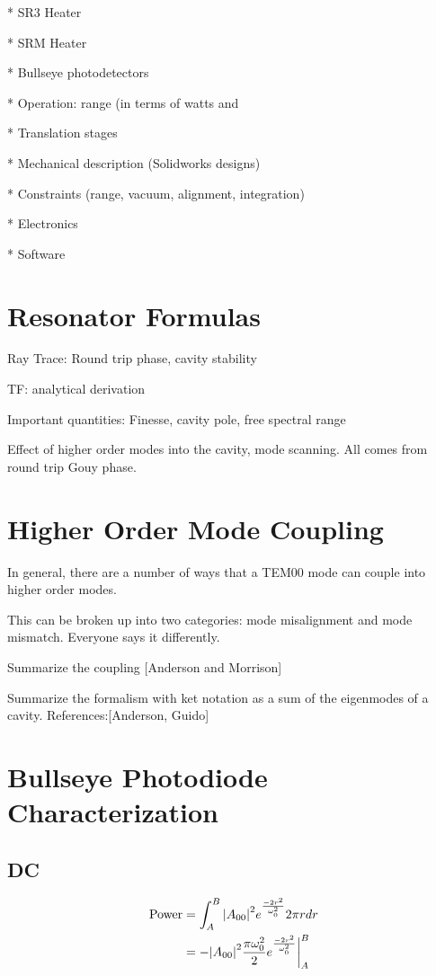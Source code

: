 \documentclass[oneside]{book}
\begin{document}
* SR3 Heater

* SRM Heater

* Bullseye photodetectors

* Operation: range (in terms of watts and %

* Translation stages

* Mechanical description (Solidworks designs)

* Constraints (range, vacuum, alignment, integration)

* Electronics 

* Software


	\listoffigures
	\listoftables

\begin{appendices}

	\chapter{Resonator Formulas}
	
	
	Ray Trace: Round trip phase, cavity stability
	
	TF: analytical derivation
	
	Important quantities: Finesse, cavity pole, free spectral range
	
	Effect of higher order modes into the cavity, mode scanning. All comes from round trip Gouy phase.
	
	
	\chapter{Higher Order Mode Coupling}
	In general, there are a number of ways that a TEM00 mode can couple into higher order modes.  
	
	This can be broken up into two categories: mode misalignment and mode mismatch.  Everyone says it differently.
	
	Summarize the coupling [Anderson and Morrison]
	
	Summarize the formalism with ket notation as a sum of the eigenmodes of a cavity.
	References:[Anderson, Guido]
	
	
	\chapter{Bullseye Photodiode Characterization}
	
	\section{DC}
	\begin{equation}
	\begin{split}
	\text{Power} &= \int_{A}^{B} \abs{A_{00}}^2e^{\frac{-2r^2}{\omega_{0}^2}} 2\pi r dr\\
			&= -\abs{A_{00}}^2 \frac{\pi \omega_{0}^2}{2} e^{\frac{-2r^2}{\omega_{0}^2}} \biggr\rvert_A^B
	\end{split}
	\end{equation}
	

\end{appendices}
\end{document}
